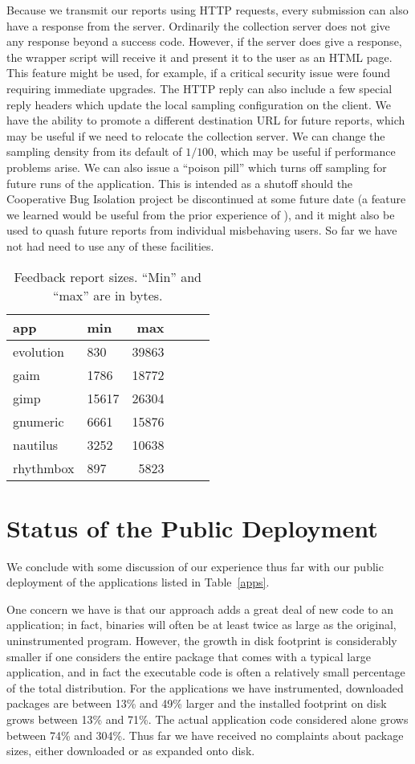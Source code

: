\documentclass[times,10pt,twocolumn]{article}
\begin{document}
Because we transmit our reports using HTTP requests, every submission
can also have a response from the server.
Ordinarily the collection server does not give any response beyond a
success code.  However, if the server does give a response, the
wrapper script will receive it and present it to the user as an HTML
page.  This feature might be used, for example, if a critical security
issue were found requiring immediate upgrades.  
The HTTP reply can also include a few special reply headers which
update the local sampling configuration on the client.  We have the
ability to promote a different destination URL for future reports,
which may be useful if we need to relocate the collection server.  We
can change the sampling density from its default of $1/100$, which may be
useful if performance problems arise.  We can also issue a ``poison
pill'' which turns off sampling for future runs of the application.
This is intended as a shutoff should the Cooperative Bug
Isolation project be discontinued at some future date (a feature we
learned would be useful from the prior experience of \cite{Elbaum:2003:DISATA}), and it might also
be used to quash future reports from individual misbehaving users.  So
far we have not had need to use any of these facilities.  

\begin{table}
  \centering
  \begin{tabular}{llrrrr}
    app & min & max  \\ \hline
    evolution & 830 & 39863  \\
    gaim & 1786 & 18772  \\
    gimp & 15617 & 26304  \\
    gnumeric & 6661 & 15876  \\
    nautilus & 3252 & 10638  \\
    rhythmbox & 897 & 5823 
  \end{tabular}
  \caption{Feedback report sizes.  ``Min'' and ``max''  are
    in bytes.}
  \label{report-sizes}
\end{table}

\section{Status of the Public Deployment}

We conclude with some discussion of our experience thus far with our public
deployment of the applications listed in Table~\ref{apps}.

One concern we have is that our approach adds a great deal of new code
to an application; in fact, binaries will often be at least twice as
large as the original, uninstrumented program.  However, the growth in
disk footprint is considerably smaller if one considers the entire
package that comes with a typical large application, and in fact the
executable code is often a relatively small percentage of the total
distribution.  For the applications we have instrumented, downloaded
packages are between 13\% and 49\% larger and the installed footprint on
disk grows between 13\% and 71\%.  The actual application code
considered alone grows between 74\% and 304\%.  Thus far we have
received no complaints about package sizes, either downloaded or as
expanded onto disk.
\end{document}
